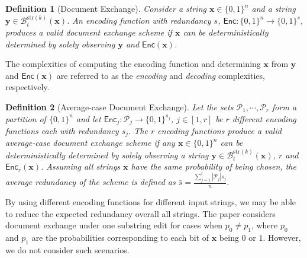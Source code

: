 \documentclass[onecolumn]{IEEEtran}
\newtheorem{definition}{Definition}
\newcommand{\bl}{n}
\newcommand{\numedits}{t}
\newcommand{\editsize}{k}
\newcommand{\editball}[3]{\mathcal{B}_{#1}^{#2}(#3)}
\newcommand{\encode}{\mathsf{Enc}}
\newcommand{\bfx}{{\mathbf{ x}}}
\newcommand{\bfy}{{\mathbf{ y}}}
\newcommand{\cP}{\mathcal{P}}
\newcommand{\vr}[1]{{\color{red} {\small [VR: #1]} }}
\begin{document}
\begin{definition}[Document Exchange]
     Consider a string $\mathbf{x} \in \{0,1\}^\bl$ and a string $\mathbf{y}\in\editball{\numedits}{\mathrm{str}(\editsize)}{\mathbf{x}}$. An \emph{encoding function} with redundancy $s$, $\encode:\{0,1\}^\bl \to \{0,1\}^s$, produces a valid \emph{document exchange scheme} if $\bfx$ can be deterministically determined by solely observing $\mathbf{y}$ and $\encode(\mathbf{x})$.
\end{definition}

The complexities of computing the encoding function and determining $\mathbf{x}$ from $\mathbf{y}$ and $\encode(\mathbf{x})$ are referred to as the \emph{encoding} and \emph{decoding} complexities, respectively.

\begin{definition}[Average-case Document Exchange]
     Let the sets $\cP_1,\cdots,\cP_r$ form a partition of $\{0,1\}^n$ and let $\encode_j:\cP_j \to \{0,1\}^{s_j}$, $j\in [1,r]$ be $r$ different encoding functions each with redundancy $s_j$. The $r$ encoding functions produce a valid \emph{average-case document exchange scheme} if any $\bfx \in \{0,1\}^\bl$ can be deterministically determined by solely observing a string $\bfy\in\editball{\numedits}{\mathrm{str}(\editsize)}{\mathbf{x}}$, $r$ and $\encode_r(\bfx)$. Assuming all strings $\bfx$ have the same probability of being chosen, the average redundancy of the scheme is defined as $\bar{s} = \frac{\sum_{j=1}^r |\cP_j|s_j}{n}.$
\end{definition}

By using different encoding functions for different input strings, we may be able to reduce the expected redundancy overall all strings. %
The paper \cite{Li_Optimal_one_substring_error} considers document exchange under one substring edit for cases when $p_0 \neq p_1$, where $p_0$ and $p_1$ are the probabilities corresponding to each bit of $\bfx$ being $0$ or $1$. However, we do not consider such scenarios. 



\end{document}
